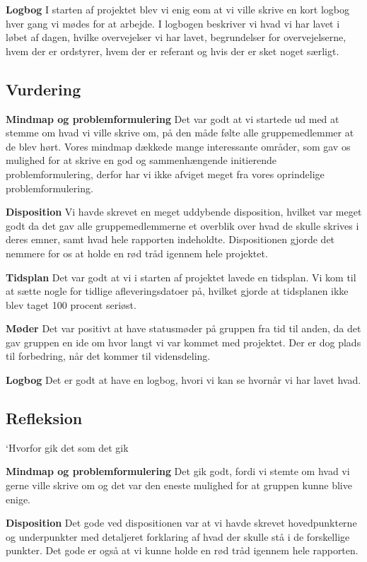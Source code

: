 \textbf{Logbog}
I starten af projektet blev vi enig eom at vi ville skrive en kort logbog hver gang vi mødes for at arbejde. I logbogen beskriver vi hvad vi har lavet i løbet af dagen, hvilke overvejelser vi har lavet, begrundelser for overvejelserne, hvem der er ordstyrer, hvem der er referant og hvis der er sket noget særligt.

\subsection{Vurdering}

\textbf{Mindmap og problemformulering}
Det var godt at vi startede ud med at stemme om hvad vi ville skrive om, på den måde følte alle gruppemedlemmer at de blev hørt. Vores mindmap dækkede mange interessante områder, som gav os mulighed for at skrive en god og sammenhængende initierende problemformulering, derfor har vi ikke afviget meget fra vores oprindelige problemformulering.

\textbf{Disposition}
Vi havde skrevet en meget uddybende disposition, hvilket var meget godt da det gav alle gruppemedlemmerne et overblik over hvad de skulle skrives i deres emner, samt hvad hele rapporten indeholdte. Dispositionen gjorde det nemmere for os at holde en rød tråd igennem hele projektet. 

\textbf{Tidsplan}
Det var godt at vi i starten af projektet lavede en tidsplan. Vi kom til at sætte nogle for tidlige afleveringsdatoer på, hvilket gjorde at tidsplanen ikke blev taget 100 procent seriøst. 

\textbf{Møder}
Det var positivt at have statusmøder på gruppen fra tid til anden, da det gav gruppen en ide om hvor langt vi var kommet med projektet. Der er dog plads til forbedring, når det kommer til vidensdeling.

\textbf{Logbog}
Det er godt at have en logbog, hvori vi kan se hvornår vi har lavet hvad.

\subsection{Refleksion}
`Hvorfor gik det som det gik

\textbf{Mindmap og problemformulering}
Det gik godt, fordi vi stemte om hvad vi gerne ville skrive om og det var den eneste mulighed for at gruppen kunne blive enige.

\textbf{Disposition}
Det gode ved dispositionen var at vi havde skrevet hovedpunkterne og underpunkter med detaljeret forklaring af hvad der skulle stå i de forskellige punkter. Det gode er også at vi kunne holde en rød tråd igennem hele rapporten.

